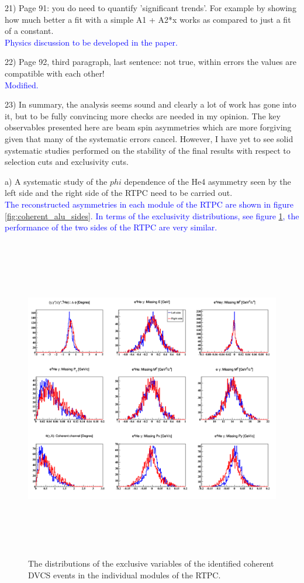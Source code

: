 21) Page 91: you do need to quantify 'significant trends'. For example by 
showing how much better a fit with a simple A1 + A2*x works as compared to just 
a fit of a constant.\\
\textcolor{blue}{Physics discussion to be developed in the paper.  }

22) Page 92, third paragraph, last sentence: not true, within errors the values 
are compatible with each other!\\
\textcolor{blue}{Modified.}

23) In summary, the analysis seems sound and clearly a lot of work has gone 
into it, but to be fully convincing more checks are needed in my opinion.  The 
key observables presented here are beam spin asymmetries which are more 
forgiving given that many of the systematic errors cancel.  However, I have yet 
to see solid systematic studies performed on the stability of the final results 
with respect to selection cuts and exclusivity cuts. 
 
 a) A systematic study of the $phi$ dependence of the He4 asymmetry seen by the 
 left side and the right side of the RTPC need to be carried out.\\
\textcolor{blue}{ The reconstructed asymmetries in each module of the RTPC are 
shown in figure \ref{fig:coherent_alu_sides}. In terms of the exclusivity 
distributions, see figure \ref{fig:sides_rtpc_exclusivity}, the performance of 
the two sides of the RTPC are very similar.}\\

\begin{figure}[tbp]
   \centering 
\includegraphics[height=14.2cm]{fig/all_coh_exc_cuts_final_sides.png} 
\caption{The distributions of the exclusive variables of the identified 
coherent DVCS events in the individual modules of the RTPC.}                                    
\label{fig:sides_rtpc_exclusivity}                                   
\end{figure}


